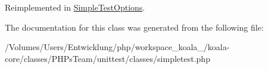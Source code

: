 Reimplemented in \hyperlink{class_simple_test_options_a6d722d3083d23b8ad3a59813aba88bb4}{SimpleTestOptions}.



The documentation for this class was generated from the following file:\begin{DoxyCompactItemize}
\item 
/Volumes/Users/Entwicklung/php/workspace\_\-koala\_/koala-\/core/classes/PHPsTeam/unittest/classes/simpletest.php\end{DoxyCompactItemize}
